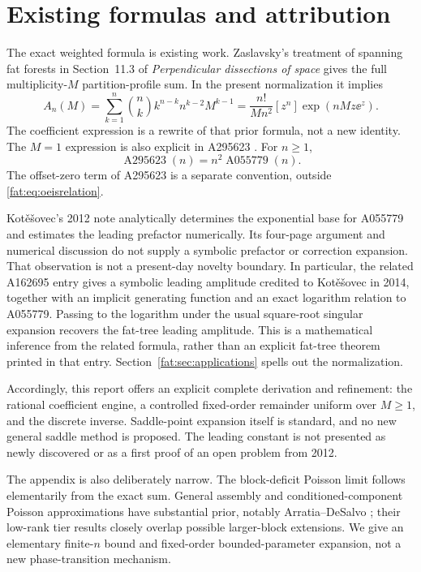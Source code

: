 \documentclass[11pt,letterpaper]{article}
\numberwithin{equation}{section}
\theoremstyle{remark}\newtheorem{remark}[theorem]{Remark}
\begin{document}
\section{Existing formulas and attribution}\label{fat:sec:prior}
The exact weighted formula is existing work. Zaslavsky's treatment of spanning fat forests in Section~11.3 of \emph{Perpendicular dissections of space} \cite{zaslavsky} gives the full multiplicity-$M$ partition-profile sum. In the present normalization it implies
\begin{equation}\label{fat:eq:exact}
 A_n(M)=\sum_{k=1}^n\binom nk k^{n-k}n^{k-2}M^{k-1}
 =\frac{n!}{Mn^2}[z^n]\exp(nM z\ee^z).
\end{equation}
The coefficient expression is a rewrite of that prior formula, not a new identity. The $M=1$ expression is also explicit in A295623 \cite{oeis295623}. For $n\ge1$,
\begin{equation}\label{fat:eq:oeisrelation}
 \operatorname{A295623}(n)=n^2\operatorname{A055779}(n).
\end{equation}
The offset-zero term of A295623 is a separate convention, outside \eqref{fat:eq:oeisrelation}.

Kot\v{e}\v{s}ovec's 2012 note \cite{kotesovec} analytically determines the exponential base for A055779 and estimates the leading prefactor numerically. Its four-page argument and numerical discussion do not supply a symbolic prefactor or correction expansion. That observation is not a present-day novelty boundary. In particular, the related A162695 entry \cite{oeis162695} gives a symbolic leading amplitude credited to Kot\v{e}\v{s}ovec in 2014, together with an implicit generating function and an exact logarithm relation to A055779. Passing to the logarithm under the usual square-root singular expansion recovers the fat-tree leading amplitude. This is a mathematical inference from the related formula, rather than an explicit fat-tree theorem printed in that entry. Section~\ref{fat:sec:applications} spells out the normalization.

Accordingly, this report offers an explicit complete derivation and refinement: the rational coefficient engine, a controlled fixed-order remainder uniform over $M\ge1$, and the discrete inverse. Saddle-point expansion itself is standard, and no new general saddle method is proposed. The leading constant is not presented as newly discovered or as a first proof of an open problem from 2012.

The appendix is also deliberately narrow. The block-deficit Poisson limit follows elementarily from the exact sum. General assembly and conditioned-component Poisson approximations have substantial prior, notably Arratia--DeSalvo \cite{arratia}; their low-rank tier results closely overlap possible larger-block extensions. We give an elementary finite-$n$ bound and fixed-order bounded-parameter expansion, not a new phase-transition mechanism.
\end{document}
